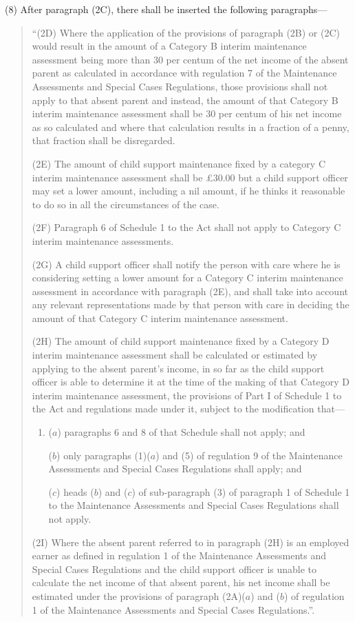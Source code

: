 \documentclass[a4paper]{article}
\begin{document}
(8) After paragraph (2C), there shall be inserted the following paragraphs—
\begin{quotation}
“(2D) Where the application of the provisions of paragraph (2B) or (2C) would result in the amount of a Category B interim maintenance assessment being more than 30 per centum of the net income of the absent parent as calculated in accordance with regulation 7 of the Maintenance Assessments and Special Cases Regulations, those provisions shall not apply to that absent parent and instead, the amount of that Category B interim maintenance assessment shall be 30 per centum of his net income as so calculated and where that calculation results in a fraction of a penny, that fraction shall be disregarded.

(2E) The amount of child support maintenance fixed by a category C interim maintenance assessment shall be £30.00 but a child support officer may set a lower amount, including a nil amount, if he thinks it reasonable to do so in all the circumstances of the case.

(2F) Paragraph 6 of Schedule 1 to the Act shall not apply to Category C interim maintenance assessments.

(2G) A child support officer shall notify the person with care where he is considering setting a lower amount for a Category C interim maintenance assessment in accordance with paragraph (2E), and shall take into account any relevant representations made by that person with care in deciding the amount of that Category C interim maintenance assessment.

(2H) The amount of child support maintenance fixed by a Category D interim maintenance assessment shall be calculated or estimated by applying to the absent parent’s income, in so far as the child support officer is able to determine it at the time of the making of that Category D interim maintenance assessment, the provisions of Part I of Schedule 1 to the Act and regulations made under it, subject to the modification that—
\begin{enumerate}\item[]
($a$) paragraphs 6 and 8 of that Schedule shall not apply; and

($b$) only paragraphs (1)($a$) and (5) of regulation 9 of the Maintenance Assessments and Special Cases Regulations shall apply; and

($c$) heads ($b$) and ($c$) of sub-paragraph (3) of paragraph 1 of Schedule 1 to the Maintenance Assessments and Special Cases Regulations shall not apply.
\end{enumerate}

(2I) Where the absent parent referred to in paragraph (2H) is an employed earner as defined in regulation 1 of the Maintenance Assessments and Special Cases Regulations and the child support officer is unable to calculate the net income of that absent parent, his net income shall be estimated under the provisions of paragraph (2A)($a$) and ($b$) of regulation 1 of the Maintenance Assessments and Special Cases Regulations.”.
\end{quotation}
\end{document}
